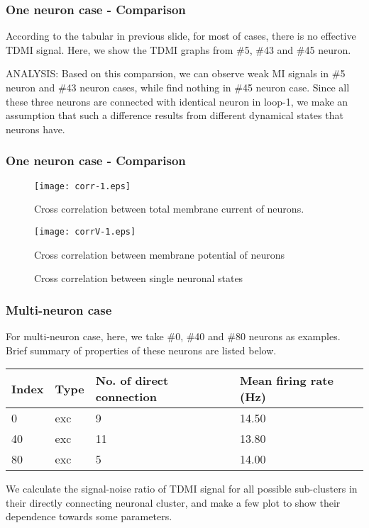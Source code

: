 \documentclass{beamer}
\begin{document}
	\begin{frame}
	\frametitle{One neuron case - Comparison}
		\footnotesize{According to the tabular in previous slide, for most of cases, there is no effective TDMI signal. Here, we show the TDMI graphs from \#5, \#43 and \#45 neuron.}
		\begin{figure}[h]
			\centering
			\label{fig:tdmi1}
		\end{figure}
		ANALYSIS: Based on this comparsion, we can observe weak MI signals in \#5 neuron and \#43 neuron cases, while find nothing in \#45 neuron case. Since all these three neurons are connected with identical neuron in loop-1, we make an assumption that such a difference results from different dynamical states that neurons have.
	\end{frame}

	\begin{frame}
	\frametitle{One neuron case - Comparison}
	\begin{figure}[h]
		\centering
		\begin{minipage}[ht]{0.48\linewidth}
			\centering
			\texttt{[image: corr-1.eps]}
			\caption{Cross correlation between total membrane current of neurons.}
		\end{minipage}
		\begin{minipage}[ht]{0.48\linewidth}
			\centering
			\texttt{[image: corrV-1.eps]}
			\caption{Cross correlation between membrane potential of neurons}
		\end{minipage}
		\caption{Cross correlation between single neuronal states}
		\label{fig:corr-1}
	\end{figure}
	\end{frame}
	
	\begin{frame}
	\frametitle{Multi-neuron case}
	\small{For multi-neuron case, here, we take \#0, \#40 and \#80 neurons as examples.
	Brief summary of properties of these neurons are listed below.}
	\begin{table}[h]
	\footnotesize
	\centering
	\begin{tabular}{l l l l}
		\hline
		Index & Type & No. of direct connection & Mean firing rate (Hz)\\
		\hline
		0			& exc  & 9 	& 14.50\\
		40		& exc  & 11 & 13.80\\
		80		& exc  & 5 	& 14.00\\
		\hline
	\end{tabular}
	\end{table}
	\small{We calculate the signal-noise ratio of TDMI signal for all possible sub-clusters in their directly connecting neuronal cluster, and make a few plot to show their dependence towards some parameters.}
	\end{frame}
\end{document}
